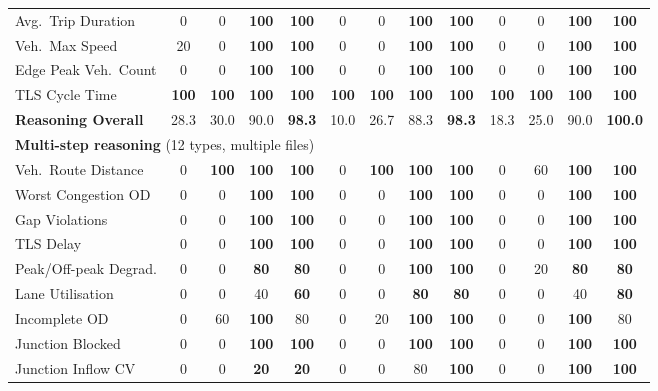 \begin{table}[t]
{\begin{tabular}{l|cccc|cccc|cccc}
Avg.\ Trip Duration         & 0 & 0 & \textbf{100} & \textbf{100} & 0 & 0 & \textbf{100} & \textbf{100} & 0 & 0 & \textbf{100} & \textbf{100} \\
Veh.\ Max Speed             & 20 & 0 & \textbf{100} & \textbf{100} & 0 & 0 & \textbf{100} & \textbf{100} & 0 & 0 & \textbf{100} & \textbf{100} \\
Edge Peak Veh.\ Count       & 0 & 0 & \textbf{100} & \textbf{100} & 0 & 0 & \textbf{100} & \textbf{100} & 0 & 0 & \textbf{100} & \textbf{100} \\
TLS Cycle Time              & \textbf{100} & \textbf{100} & \textbf{100} & \textbf{100} & \textbf{100} & \textbf{100} & \textbf{100} & \textbf{100} & \textbf{100} & \textbf{100} & \textbf{100} & \textbf{100} \\
\cmidrule(lr){1-13}
\textbf{Reasoning Overall}  & 28.3 & 30.0 & 90.0 & \textbf{98.3} & 10.0 & 26.7 & 88.3 & \textbf{98.3} & 18.3 & 25.0 & 90.0 & \textbf{100.0} \\
\midrule
\multicolumn{13}{l}{\textbf{Multi-step reasoning} (12 types, multiple files)}\\
Veh.\ Route Distance        & 0 & \textbf{100} & \textbf{100} & \textbf{100} & 0 & \textbf{100} & \textbf{100} & \textbf{100} & 0 & 60 & \textbf{100} & \textbf{100} \\
Worst Congestion OD         & 0 & 0 & \textbf{100} & \textbf{100} & 0 & 0 & \textbf{100} & \textbf{100} & 0 & 0 & \textbf{100} & \textbf{100} \\
Gap Violations              & 0 & 0 & \textbf{100} & \textbf{100} & 0 & 0 & \textbf{100} & \textbf{100} & 0 & 0 & \textbf{100} & \textbf{100} \\
TLS Delay                   & 0 & 0 & \textbf{100} & \textbf{100} & 0 & 0 & \textbf{100} & \textbf{100} & 0 & 0 & \textbf{100} & \textbf{100} \\
Peak/Off-peak Degrad.       & 0 & 0 & \textbf{80} & \textbf{80} & 0 & 0 & \textbf{100} & \textbf{100} & 0 & 20 & \textbf{80} & \textbf{80} \\
Lane Utilisation            & 0 & 0 & 40 & \textbf{60} & 0 & 0 & \textbf{80} & \textbf{80} & 0 & 0 & 40 & \textbf{80} \\
Incomplete OD               & 0 & 60 & \textbf{100} & 80 & 0 & 20 & \textbf{100} & \textbf{100} & 0 & 0 & \textbf{100} & 80 \\
Junction Blocked            & 0 & 0 & \textbf{100} & \textbf{100} & 0 & 0 & \textbf{100} & \textbf{100} & 0 & 0 & \textbf{100} & \textbf{100} \\
Junction Inflow CV          & 0 & 0 & \textbf{20} & \textbf{20} & 0 & 0 & 80 & \textbf{100} & 0 & 0 & \textbf{100} & \textbf{100} \\

\end{tabular}}
\end{table}
